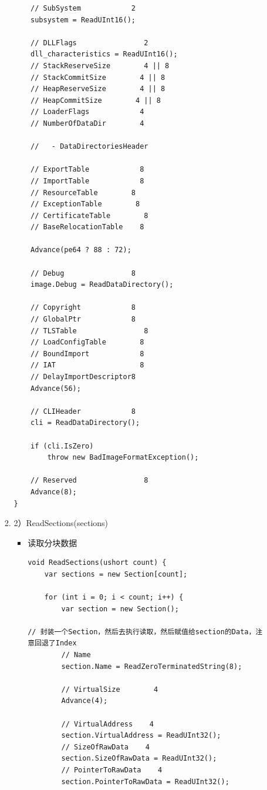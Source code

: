 \documentclass[9pt, b5paper]{article}
\begin{document}
\begin{enumerate}
\begin{enumerate}
\begin{enumerate}
\begin{verbatim}
    // SubSystem            2
    subsystem = ReadUInt16();

    // DLLFlags                2
    dll_characteristics = ReadUInt16();
    // StackReserveSize        4 || 8
    // StackCommitSize        4 || 8
    // HeapReserveSize        4 || 8
    // HeapCommitSize        4 || 8
    // LoaderFlags            4
    // NumberOfDataDir        4

    //   - DataDirectoriesHeader

    // ExportTable            8
    // ImportTable            8
    // ResourceTable        8
    // ExceptionTable        8
    // CertificateTable        8
    // BaseRelocationTable    8

    Advance(pe64 ? 88 : 72);

    // Debug                8
    image.Debug = ReadDataDirectory();

    // Copyright            8
    // GlobalPtr            8
    // TLSTable                8
    // LoadConfigTable        8
    // BoundImport            8
    // IAT                    8
    // DelayImportDescriptor8
    Advance(56);

    // CLIHeader            8
    cli = ReadDataDirectory();

    if (cli.IsZero)
        throw new BadImageFormatException();

    // Reserved                8
    Advance(8);
}
\end{verbatim}
\item 2）ReadSections(sections)
\label{sec-10-1-3-1-3-2}
\begin{itemize}
\item 读取分块数据
\begin{verbatim}
void ReadSections(ushort count) {
    var sections = new Section[count];

    for (int i = 0; i < count; i++) {
        var section = new Section();

// 封装一个Section，然后去执行读取，然后赋值给section的Data，注意回退了Index        
        // Name
        section.Name = ReadZeroTerminatedString(8);

        // VirtualSize        4
        Advance(4);

        // VirtualAddress    4
        section.VirtualAddress = ReadUInt32();
        // SizeOfRawData    4
        section.SizeOfRawData = ReadUInt32();
        // PointerToRawData    4
        section.PointerToRawData = ReadUInt32();


\end{verbatim}
\end{itemize}
\end{enumerate}
\end{enumerate}
\end{enumerate}
\end{document}
